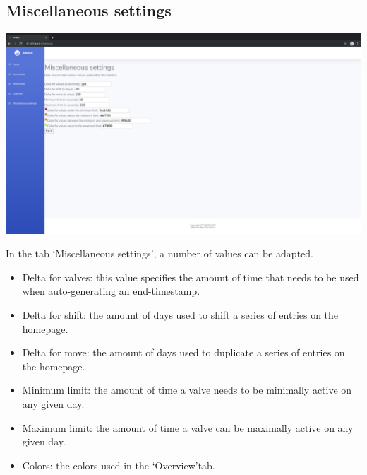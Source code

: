 \documentclass[12pt]{article}
\begin{document}
\subsection{Miscellaneous settings}
\begin{center}
	\includegraphics[width=\linewidth]{images/Misc_settings.png}
\end{center}
In the tab \lq Miscellaneous settings\rq, a number of values can be adapted.
\begin{itemize}
	\item Delta for valves: this value specifies the amount of time that needs to be used when auto-generating an end-timestamp.
	\item Delta for shift: the amount of days used to shift a series of entries on the homepage.
	\item Delta for move: the amount of days used to duplicate a series of entries on the homepage.
	\item Minimum limit: the amount of time a valve needs to be minimally active on any given day.
	\item Maximum limit: the amount of time a valve can be maximally active on any given day.
	\item Colors: the colors used in the \lq Overview\rq tab.
\end{itemize}
\end{document}
